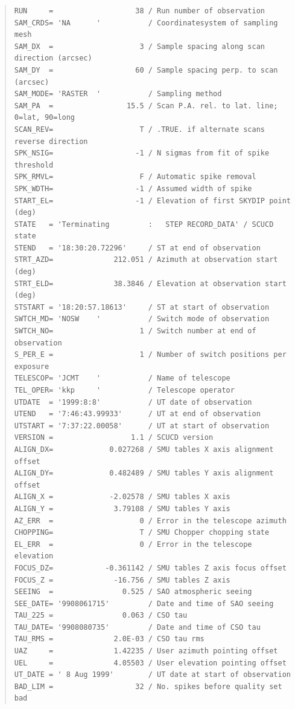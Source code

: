 \documentclass[twoside,11pt]{article}
\newenvironment{myquote}{\begin{quote}\begin{small}}{\end{small}\end{quote}}
\renewcommand{\_}{\texttt{\symbol{95}}}
\begin{document}
\begin{myquote}
\begin{verbatim}
RUN     =                   38 / Run number of observation
SAM_CRDS= 'NA      '           / Coordinatesystem of sampling mesh
SAM_DX  =                    3 / Sample spacing along scan direction (arcsec)
SAM_DY  =                   60 / Sample spacing perp. to scan (arcsec)
SAM_MODE= 'RASTER  '           / Sampling method
SAM_PA  =                 15.5 / Scan P.A. rel. to lat. line; 0=lat, 90=long
SCAN_REV=                    T / .TRUE. if alternate scans reverse direction
SPK_NSIG=                   -1 / N sigmas from fit of spike threshold
SPK_RMVL=                    F / Automatic spike removal
SPK_WDTH=                   -1 / Assumed width of spike
START_EL=                   -1 / Elevation of first SKYDIP point (deg)
STATE   = 'Terminating         :   STEP RECORD_DATA' / SCUCD state
STEND   = '18:30:20.72296'     / ST at end of observation
STRT_AZD=              212.051 / Azimuth at observation start (deg)
STRT_ELD=              38.3846 / Elevation at observation start (deg)
STSTART = '18:20:57.18613'     / ST at start of observation
SWTCH_MD= 'NOSW    '           / Switch mode of observation
SWTCH_NO=                    1 / Switch number at end of observation
S_PER_E =                    1 / Number of switch positions per exposure
TELESCOP= 'JCMT    '           / Name of telescope
TEL_OPER= 'kkp     '           / Telescope operator
UTDATE  = '1999:8:8'           / UT date of observation
UTEND   = '7:46:43.99933'      / UT at end of observation
UTSTART = '7:37:22.00058'      / UT at start of observation
VERSION =                  1.1 / SCUCD version
ALIGN_DX=             0.027268 / SMU tables X axis alignment offset
ALIGN_DY=             0.482489 / SMU tables Y axis alignment offset
ALIGN_X =             -2.02578 / SMU tables X axis
ALIGN_Y =              3.79108 / SMU tables Y axis
AZ_ERR  =                    0 / Error in the telescope azimuth
CHOPPING=                    T / SMU Chopper chopping state
EL_ERR  =                    0 / Error in the telescope elevation
FOCUS_DZ=            -0.361142 / SMU tables Z axis focus offset
FOCUS_Z =              -16.756 / SMU tables Z axis
SEEING  =                0.525 / SAO atmospheric seeing
SEE_DATE= '9908061715'         / Date and time of SAO seeing
TAU_225 =                0.063 / CSO tau
TAU_DATE= '9908080735'         / Date and time of CSO tau
TAU_RMS =              2.0E-03 / CSO tau rms
UAZ     =              1.42235 / User azimuth pointing offset
UEL     =              4.05503 / User elevation pointing offset
UT_DATE = ' 8 Aug 1999'        / UT date at start of observation
BAD_LIM =                   32 / No. spikes before quality set bad

\end{verbatim}
\end{myquote}
\end{document}
